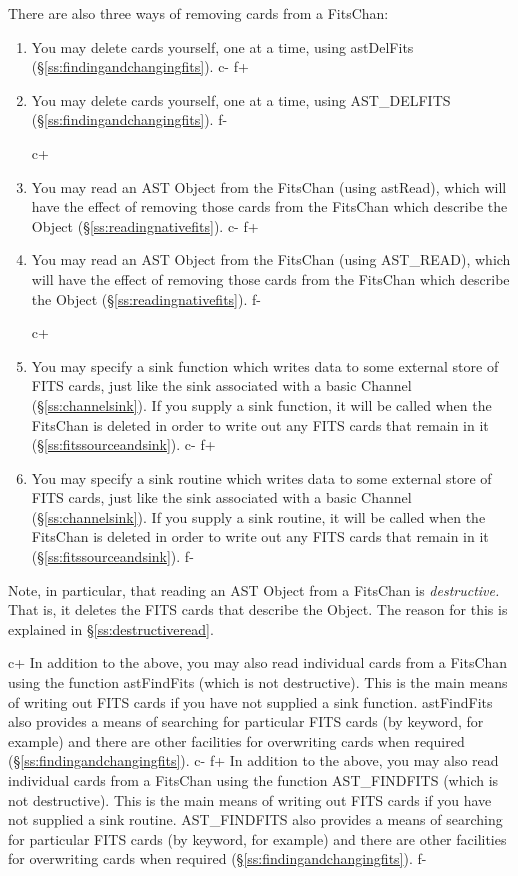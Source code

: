 \documentclass[twoside,11pt]{article}
\newcommand{\secref}[1]{\S\ref{#1}}
\newcommand{\secref}[1]{\ref{#1}}
\begin{document}
There are also three ways of removing cards from a FitsChan:

\begin{enumerate}
c+
\item You may delete cards yourself, one at a time, using astDelFits
(\secref{ss:findingandchangingfits}).
c-
f+
\item You may delete cards yourself, one at a time, using AST\_DELFITS
(\secref{ss:findingandchangingfits}).
f-

c+
\item You may read an AST Object from the FitsChan (using astRead),
which will have the effect of removing those cards from the FitsChan
which describe the Object (\secref{ss:readingnativefits}).
c-
f+
\item You may read an AST Object from the FitsChan (using AST\_READ),
which will have the effect of removing those cards from the FitsChan
which describe the Object (\secref{ss:readingnativefits}).
f-

c+
\item You may specify a sink function which writes data to some
external store of FITS cards, just like the sink associated with a
basic Channel (\secref{ss:channelsink}). If you supply a sink function,
it will be called when the FitsChan is deleted in order to write out
any FITS cards that remain in it (\secref{ss:fitssourceandsink}).
c-
f+
\item You may specify a sink routine which writes data to some
external store of FITS cards, just like the sink associated with a
basic Channel (\secref{ss:channelsink}). If you supply a sink routine,
it will be called when the FitsChan is deleted in order to write out
any FITS cards that remain in it (\secref{ss:fitssourceandsink}).
f-
\end{enumerate}
 
Note, in particular, that reading an AST Object from a FitsChan is
{\em{destructive.}} That is, it deletes the FITS cards that describe the
Object. The reason for this is explained in
\secref{ss:destructiveread}.

c+
In addition to the above, you may also read individual cards from a
FitsChan using the function astFindFits (which is not
destructive). This is the main means of writing out FITS cards if you
have not supplied a sink function.  astFindFits also provides a means
of searching for particular FITS cards (by keyword, for example) and
there are other facilities for overwriting cards when required
(\secref{ss:findingandchangingfits}).
c-
f+
In addition to the above, you may also read individual cards from a
FitsChan using the function AST\_FINDFITS (which is not
destructive). This is the main means of writing out FITS cards if you
have not supplied a sink routine.  AST\_FINDFITS also provides a means
of searching for particular FITS cards (by keyword, for example) and
there are other facilities for overwriting cards when required
(\secref{ss:findingandchangingfits}).
f-
\end{document}

